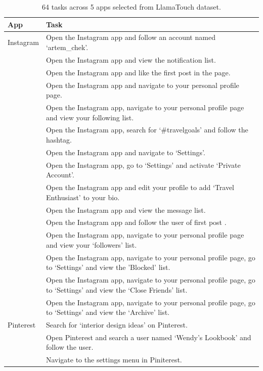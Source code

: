 \begin{longtable}{|p{1.8cm}|p{10.5cm}|}
\caption{64 tasks across 5 apps selected from LlamaTouch dataset.}
\label{tab:task-list-llamatouch}\\
\hline
\textbf{App} & \textbf{Task} \\
\hline
Instagram & Open the Instagram app and follow an account named `artem\_chek'. \\
          & Open the Instagram app and view the notification list. \\
        & Open the Instagram app and like the first post in the page. \\
        & Open the Instagram app and navigate to your personal profile page. \\
        & Open the Instagram app, navigate to your personal profile page and view your following list. \\
        & Open the Instagram app, search for `\#travelgoals' and follow the hashtag. \\
        & Open the Instagram app and navigate to `Settings'. \\
        & Open the Instagram app, go to `Settings' and activate `Private Account'. \\
         & Open the Instagram app and edit your profile to add `Travel Enthusiast' to your bio. \\
        & Open the Instagram app and view the message list. \\
        & Open the Instagram app and follow the user of first post . \\
        & Open the Instagram app, navigate to your personal profile page and view your `followers' list. \\
        \hline
        & Open the Instagram app, navigate to your personal profile page, go to `Settings' and view the 'Blocked' list. \\
        & Open the Instagram app, navigate to your personal profile page, go to `Settings' and view the `Close Friends' list. \\
        & Open the Instagram app, navigate to your personal profile page, go to `Settings' and view the `Archive' list. \\
\hline
Pinterest & Search for `interior design ideas' on Pinterest. \\
        & Open Pinterest and search a user named `Wendy's Lookbook' and follow the user. \\
        & Navigate to the settings menu in Piniterest. \\

\end{longtable}

